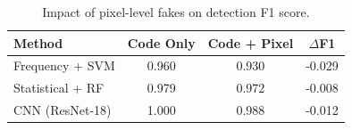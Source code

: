 
\begin{table}[h]
\centering
\caption{Impact of pixel-level fakes on detection F1 score.}
\label{tab:impact}
\begin{tabular}{lccc}
\toprule
\textbf{Method} & \textbf{Code Only} & \textbf{Code + Pixel} & \textbf{$\Delta$F1} \\
\midrule
Frequency + SVM & 0.960 & 0.930 & -0.029 \\
Statistical + RF & 0.979 & 0.972 & -0.008 \\
CNN (ResNet-18) & 1.000 & 0.988 & -0.012 \\
\bottomrule
\end{tabular}
\end{table}